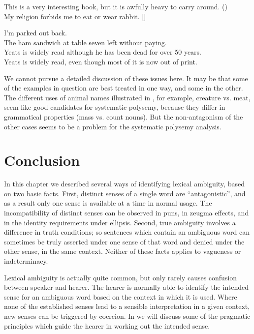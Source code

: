 \ea \label{ex:5.23}
\ea This is a very interesting book, but it is awfully heavy to carry around. (\citealt{Cruse2004})\\
\ex My religion forbids me to eat or wear rabbit.  [\citealt{NunbergZaenen1992}]
                       \z
\z

\ea \label{ex:5.24}
\ea I’m parked out back.\\
\ex The ham sandwich at table seven left without paying.\\
\ex Yeats is widely read although he has been dead for over 50 years.\\
\ex Yeats is widely read, even though most of it is now out of print.
                       \z
\z

\ea \label{ex:5.25}
                       \z
\z


We cannot pursue a detailed discussion of these issues here. It may be that some of the examples in question are best treated in one way, and some in the other. The different uses of animal names illustrated in , for example, creature vs. meat, seem like good candidates for systematic polysemy, because they differ in grammatical properties (mass vs. count nouns). But the non-antagonism of the other cases seems to be a problem for the systematic polysemy analysis.


\section{Conclusion}\label{sec:5.6}

In this chapter we described several ways of identifying lexical ambiguity, based on two basic facts. First, distinct senses of a single word are “antagonistic”, and as a result only one sense is available at a time in normal usage. The incompatibility of distinct senses can be observed in puns, in zeugma effects, and in the identity requirements under ellipsis. Second, true ambiguity involves a difference in truth conditions; so sentences which contain an ambiguous word can sometimes be truly asserted under one sense of that word and denied under the other sense, in the same context. Neither of these facts applies to vagueness or indeterminacy.



Lexical ambiguity is actually quite common, but only rarely causes confusion between speaker and hearer. The hearer is normally able to identify the intended sense for an ambiguous word based on the context in which it is used. Where none of the established senses lead to a sensible interpretation in a given context, new senses can be triggered by coercion. In  we will discuss some of the pragmatic principles which guide the hearer in working out the intended sense.



